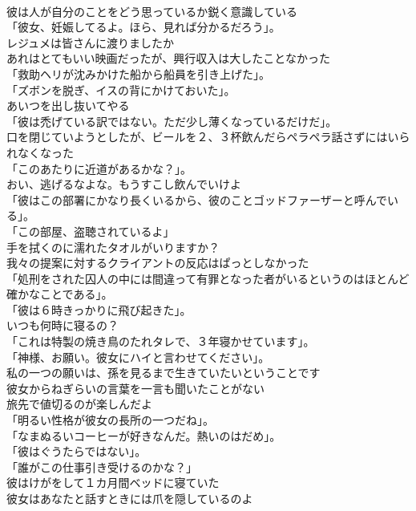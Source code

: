 \documentclass[8pt]{extreport}
\begin{document}
\begin{CJK}{UTF8}{min}
\\	彼は人が自分のことをどう思っているか鋭く意識している	
\\	「彼女、妊娠してるよ。ほら、見れば分かるだろう」。	
\\	レジュメは皆さんに渡りましたか	
\\	あれはとてもいい映画だったが、興行収入は大したことなかった	
\\	「救助ヘリが沈みかけた船から船員を引き上げた」。	
\\	「ズボンを脱ぎ、イスの背にかけておいた」。	
\\	あいつを出し抜いてやる	
\\	「彼は禿げている訳ではない。ただ少し薄くなっているだけだ」。	
\\	口を閉じていようとしたが、ビールを２、３杯飲んだらペラペラ話さずにはいられなくなった	
\\	「このあたりに近道があるかな？」。	
\\	おい、逃げるなよな。もうすこし飲んでいけよ	
\\	「彼はこの部署にかなり長くいるから、彼のことゴッドファーザーと呼んでいる」。	
\\	「この部屋、盗聴されているよ」	
\\	手を拭くのに濡れたタオルがいりますか？	
\\	我々の提案に対するクライアントの反応はぱっとしなかった	
\\	「処刑をされた囚人の中には間違って有罪となった者がいるというのはほとんど確かなことである」。	
\\	「彼は６時きっかりに飛び起きた」。	
\\	いつも何時に寝るの？	
\\	「これは特製の焼き鳥のたれタレで、３年寝かせています」。	
\\	「神様、お願い。彼女にハイと言わせてください」。	
\\	私の一つの願いは、孫を見るまで生きていたいということです	
\\	彼女からねぎらいの言葉を一言も聞いたことがない	
\\	旅先で値切るのが楽しんだよ	
\\	「明るい性格が彼女の長所の一つだね」。	
\\	「なまぬるいコーヒーが好きなんだ。熱いのはだめ」。	
\\	「彼はぐうたらではない」。	
\\	「誰がこの仕事引き受けるのかな？」	
\\	彼はけがをして１カ月間ベッドに寝ていた	
\\	彼女はあなたと話すときには爪を隠しているのよ	

\end{CJK}
\end{document}
